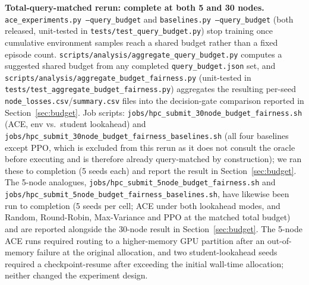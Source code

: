 \documentclass[twoside]{article}
\theoremstyle{plain}
\theoremstyle{definition}
\theoremstyle{remark}
\begin{document}
\textbf{Total-query-matched rerun: complete at both 5 and 30 nodes.} \texttt{ace\_experiments.py --query\_budget} and \texttt{baselines.py --query\_budget} (both released, unit-tested in \texttt{tests/test\_query\_budget.py}) stop training once cumulative environment samples reach a shared budget rather than a fixed episode count. \texttt{scripts/analysis/aggregate\_query\_budget.py} computes a suggested shared budget from any completed \texttt{query\_budget.json} set, and \texttt{scripts/analysis/aggregate\_budget\_fairness.py} (unit-tested in \texttt{tests/test\_aggregate\_budget\_fairness.py}) aggregates the resulting per-seed \texttt{node\_losses.csv}/\texttt{summary.csv} files into the decision-gate comparison reported in Section~\ref{sec:budget}. Job scripts: \texttt{jobs/hpc\_submit\_30node\_budget\_fairness.sh} (ACE, env vs.\ student lookahead) and \texttt{jobs/hpc\_submit\_30node\_budget\_fairness\_baselines.sh} (all four baselines except PPO, which is excluded from this rerun as it does not consult the oracle before executing and is therefore already query-matched by construction); we ran these to completion (5 seeds each) and report the result in Section~\ref{sec:budget}. The 5-node analogues, \texttt{jobs/hpc\_submit\_5node\_budget\_fairness.sh} and \texttt{jobs/hpc\_submit\_5node\_budget\_fairness\_baselines.sh}, have likewise been run to completion (5 seeds per cell; ACE under both lookahead modes, and Random, Round-Robin, Max-Variance and PPO at the matched total budget) and are reported alongside the 30-node result in Section~\ref{sec:budget}. The 5-node ACE runs required routing to a higher-memory GPU partition after an out-of-memory failure at the original allocation, and two student-lookahead seeds required a checkpoint-resume after exceeding the initial wall-time allocation; neither changed the experiment design.
\end{document}
